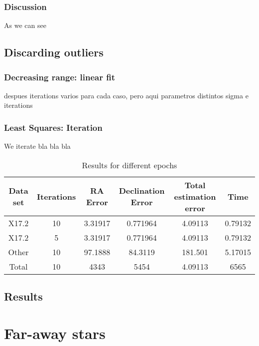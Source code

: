 \subsubsection{Discussion}

As we can see

\subsection{Discarding outliers}

\subsubsection{Decreasing range: linear fit}

despues iterations varios para cada caso, pero aqui parametros distintos sigma e iterations

\subsubsection{Least Squares: Iteration}

We iterate bla bla bla

\begin{table}[h!]
	\centering
	\def\arraystretch{1.2}
	\begin{tabular}{|c c c c c c|} 
		\hline
		Data set & Iterations & RA Error & Declination Error & Total estimation error & Time \\ [0.5ex] 
		\hline\hline
		X17.2 & 10 & 3.31917 & 0.771964 & 4.09113 & 0.79132 \\
		\hline
		X17.2 & 5 & 3.31917 & 0.771964 & 4.09113 & 0.79132 \\
		\hline
		Other & 10 & 97.1888 & 84.3119 & 181.501 & 5.17015 \\
		\hline\hline
		Total & 10 & 4343 & 5454 & 4.09113 & 6565 \\
		\hline
	\end{tabular}
	\caption{Results for different epochs}
\end{table}

\subsection{Results}




\section{Far-away stars}

